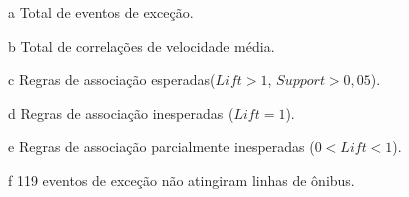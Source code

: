 \documentclass[
	12pt,				%
	oneside,			%
	a4paper,			%
	english,			%
	brazil				%
	]{abntex2ppgsi}
\begin{document}
{{{\begin{apendicesenv}
\begin{table}[!htb]
\begin{threeparttable}
\begin{tablenotes}
            \item[a] Total de eventos de exceção.
            \item[b] Total de correlações de velocidade média.
            \item[c] Regras de associação esperadas($Lift > 1$, $Support > 0,05$).
            \item[d] Regras de associação inesperadas ($Lift = 1$).
            \item[e] Regras de associação parcialmente inesperadas ($0 < Lift < 1$).
            \item[f] 119 eventos de exceção não atingiram linhas de ônibus.
        \end{tablenotes}
\end{threeparttable}
\end{table}



\end{apendicesenv}}}}
\end{document}
